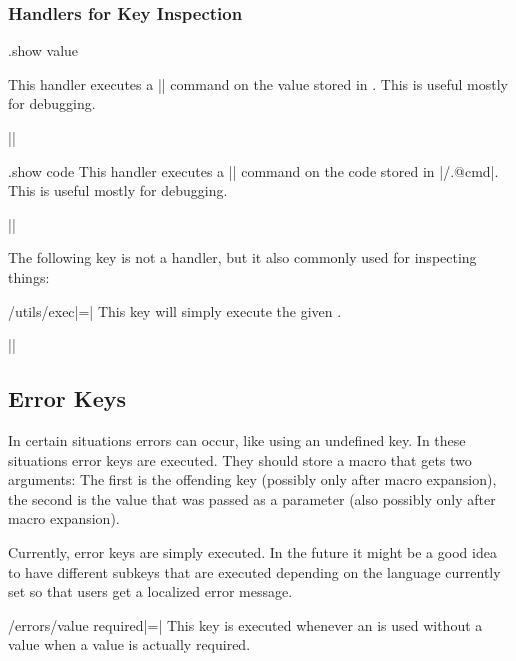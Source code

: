 \subsubsection{Handlers for Key Inspection}

\begin{handler}{.show value}{}

  This handler executes a |\show| command on the value stored in
  . This is useful mostly for debugging.

  \example ||
\end{handler}

\begin{handler}{.show code}{}
  This handler executes a |\show| command on the code stored in
  |/.@cmd|. This is useful mostly for debugging.

  \example ||
\end{handler}

The following key is not a handler, but it also commonly used for
inspecting things:
\begin{docKey}{/utils/exec}{|=|}{}
  This key will simply execute the given . 

  \example ||
\end{docKey}


\subsection{Error Keys}

In certain situations errors can occur, like using an undefined
key. In these situations error keys are executed. They should store a
macro that gets two arguments: The first is the offending key
(possibly only after macro expansion), the second is the value that
was passed as a parameter (also possibly only after macro expansion).

Currently, error keys are simply executed. In the future it might be a
good idea to have different subkeys that are executed depending on the
language currently set so that users get a localized error message.

\begin{docKey}{/errors/value required}{|=|}{}
  This key is executed whenever an  is used
  without a value when a value is actually required. 
\end{docKey}



